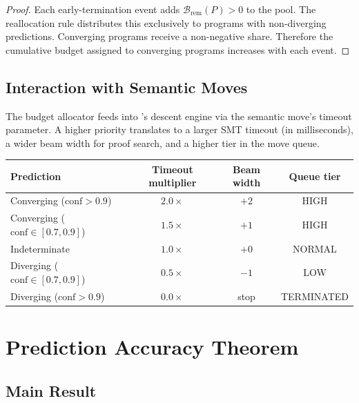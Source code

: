 \documentclass[11pt]{article}
\newcommand{\Budget}{\mathcal{B}}           %
\newcommand{\BudgetRem}[1]{\Budget_{\mathrm{rem}}(#1)}
\begin{document}
\begin{proof}
Each early-termination event adds $\BudgetRem{P} > 0$ to the pool.
The reallocation rule distributes this exclusively to programs with
non-diverging predictions.  Converging programs receive a non-negative
share.  Therefore the cumulative budget assigned to converging programs
increases with each event.
\end{proof}

\subsection{Interaction with Semantic Moves}

The budget allocator feeds into \JuGeo's descent engine via the
\VERIFY{} semantic move's timeout parameter.  A higher priority
translates to a larger SMT timeout (in milliseconds), a wider beam
width for proof search, and a higher tier in the move queue.

\begin{center}
\begin{tabular}{lccc}
\toprule
Prediction & Timeout multiplier & Beam width & Queue tier \\
\midrule
Converging ($\mathrm{conf} > 0.9$) & $2.0\times$ & $+2$ & HIGH \\
Converging ($\mathrm{conf} \in [0.7, 0.9]$) & $1.5\times$ & $+1$ & HIGH \\
Indeterminate & $1.0\times$ & $+0$ & NORMAL \\
Diverging ($\mathrm{conf} \in [0.7, 0.9]$) & $0.5\times$ & $-1$ & LOW \\
Diverging ($\mathrm{conf} > 0.9$) & $0.0\times$ & stop & TERMINATED \\
\bottomrule
\end{tabular}
\end{center}

\section{Prediction Accuracy Theorem}\label{sec:theorem}

\subsection{Main Result}
\end{document}
